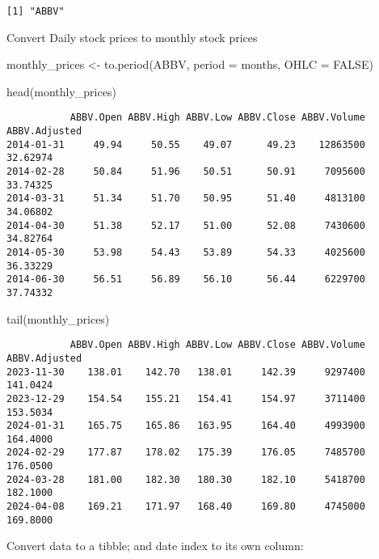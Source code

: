 \documentclass[
  letterpaper,
  DIV=11,
  numbers=noendperiod]{scrartcl}
\newenvironment{Shaded}{\begin{snugshade}}{\end{snugshade}}
\newcommand{\AttributeTok}[1]{\textcolor[rgb]{0.40,0.45,0.13}{#1}}
\newcommand{\ConstantTok}[1]{\textcolor[rgb]{0.56,0.35,0.01}{#1}}
\newcommand{\FunctionTok}[1]{\textcolor[rgb]{0.28,0.35,0.67}{#1}}
\newcommand{\NormalTok}[1]{\textcolor[rgb]{0.00,0.23,0.31}{#1}}
\newcommand{\OtherTok}[1]{\textcolor[rgb]{0.00,0.23,0.31}{#1}}
\newcommand{\StringTok}[1]{\textcolor[rgb]{0.13,0.47,0.30}{#1}}
\begin{document}
\begin{verbatim}
[1] "ABBV"
\end{verbatim}

Convert Daily stock prices to monthly stock prices

\begin{Shaded}
\begin{Highlighting}[]
\NormalTok{monthly\_prices }\OtherTok{\textless{}{-}} \FunctionTok{to.period}\NormalTok{(ABBV, }\AttributeTok{period =} \StringTok{\textquotesingle{}months\textquotesingle{}}\NormalTok{, }\AttributeTok{OHLC =} \ConstantTok{FALSE}\NormalTok{)}

\FunctionTok{head}\NormalTok{(monthly\_prices)}
\end{Highlighting}
\end{Shaded}

\begin{verbatim}
           ABBV.Open ABBV.High ABBV.Low ABBV.Close ABBV.Volume ABBV.Adjusted
2014-01-31     49.94     50.55    49.07      49.23    12863500      32.62974
2014-02-28     50.84     51.96    50.51      50.91     7095600      33.74325
2014-03-31     51.34     51.70    50.95      51.40     4813100      34.06802
2014-04-30     51.38     52.17    51.00      52.08     7430600      34.82764
2014-05-30     53.98     54.43    53.89      54.33     4025600      36.33229
2014-06-30     56.51     56.89    56.10      56.44     6229700      37.74332
\end{verbatim}

\begin{Shaded}
\begin{Highlighting}[]
\FunctionTok{tail}\NormalTok{(monthly\_prices) }
\end{Highlighting}
\end{Shaded}

\begin{verbatim}
           ABBV.Open ABBV.High ABBV.Low ABBV.Close ABBV.Volume ABBV.Adjusted
2023-11-30    138.01    142.70   138.01     142.39     9297400      141.0424
2023-12-29    154.54    155.21   154.41     154.97     3711400      153.5034
2024-01-31    165.75    165.86   163.95     164.40     4993900      164.4000
2024-02-29    177.87    178.02   175.39     176.05     7485700      176.0500
2024-03-28    181.00    182.30   180.30     182.10     5418700      182.1000
2024-04-08    169.21    171.97   168.40     169.80     4745000      169.8000
\end{verbatim}

Convert data to a tibble; and date index to its own column:
\end{document}
